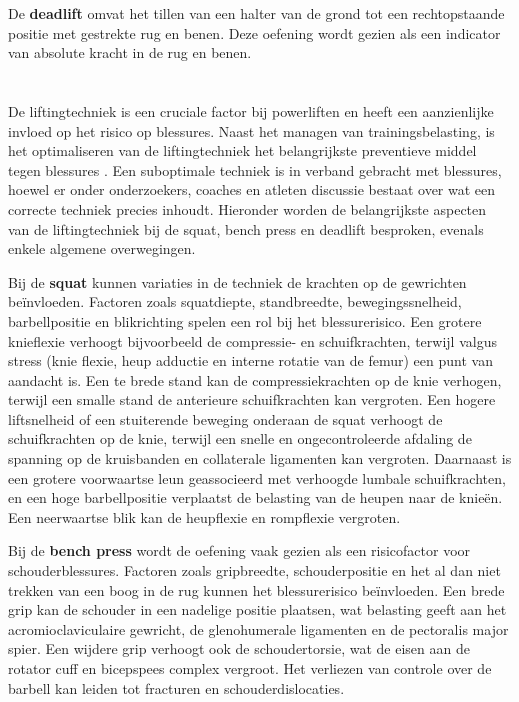 \medskip

De \textbf{deadlift} omvat het tillen van een halter van de grond tot een rechtopstaande positie met gestrekte rug en benen. 
Deze oefening wordt gezien als een indicator van absolute kracht in de rug en benen.

\section{}%
\label{sec:verkeerde-liftingtechniek}

De liftingtechniek is een cruciale factor bij powerliften en heeft een aanzienlijke invloed op het risico op blessures. 
Naast het managen van trainingsbelasting, is het optimaliseren van de liftingtechniek het belangrijkste preventieve middel tegen blessures \autocite{StrömbäckEtAl2018}.
Een suboptimale techniek is in verband gebracht met blessures, hoewel er onder onderzoekers, coaches en atleten discussie bestaat over wat een correcte techniek precies inhoudt. 
Hieronder worden de belangrijkste aspecten van de liftingtechniek bij de squat, bench press en deadlift besproken, evenals enkele algemene overwegingen.

\medskip

Bij de \textbf{squat} kunnen variaties in de techniek de krachten op de gewrichten beïnvloeden. 
Factoren zoals squatdiepte, standbreedte, bewegingssnelheid, barbellpositie en blikrichting spelen een rol bij het blessurerisico. 
Een grotere knieflexie verhoogt bijvoorbeeld de compressie- en schuifkrachten, terwijl valgus stress (knie flexie, heup adductie en interne rotatie van de femur) een punt van aandacht is. 
Een te brede stand kan de compressiekrachten op de knie verhogen, terwijl een smalle stand de anterieure schuifkrachten kan vergroten. 
Een hogere liftsnelheid of een stuiterende beweging onderaan de squat verhoogt de schuifkrachten op de knie, terwijl een snelle en ongecontroleerde afdaling de spanning op de kruisbanden en collaterale ligamenten kan vergroten. 
Daarnaast is een grotere voorwaartse leun geassocieerd met verhoogde lumbale schuifkrachten, en een hoge barbellpositie verplaatst de belasting van de heupen naar de knieën. 
Een neerwaartse blik kan de heupflexie en rompflexie vergroten.

\medskip

Bij de \textbf{bench press} wordt de oefening vaak gezien als een risicofactor voor schouderblessures. 
Factoren zoals gripbreedte, schouderpositie en het al dan niet trekken van een boog in de rug kunnen het blessurerisico beïnvloeden. 
Een brede grip kan de schouder in een nadelige positie plaatsen, wat belasting geeft aan het acromioclaviculaire gewricht, de glenohumerale ligamenten en de pectoralis major spier. 
Een wijdere grip verhoogt ook de schoudertorsie, wat de eisen aan de rotator cuff en bicepspees complex vergroot. 
Het verliezen van controle over de barbell kan leiden tot fracturen en schouderdislocaties.

